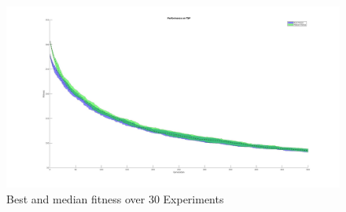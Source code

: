 \documentclass[a4paper, 12pt]{article}
\begin{document}
\begin{figure}[ht!]
  \centering
  \includegraphics[width=1.0\textwidth]{images/1000X30_updated.jpg}
  \caption{Best and median fitness over 30 Experiments\label{fig:mutfig}}
\end{figure}
\end{document}
